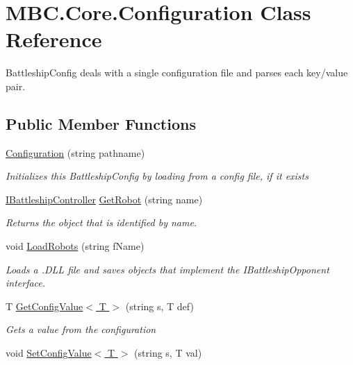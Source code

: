 \hypertarget{class_m_b_c_1_1_core_1_1_configuration}{\section{M\-B\-C.\-Core.\-Configuration Class Reference}
\label{class_m_b_c_1_1_core_1_1_configuration}
}


Battleship\-Config deals with a single configuration file and parses each key/value pair. 


\subsection*{Public Member Functions}
\begin{DoxyCompactItemize}
\item 
\hypertarget{class_m_b_c_1_1_core_1_1_configuration_aa23a1361918822852458878233671d96}{\hyperlink{class_m_b_c_1_1_core_1_1_configuration_aa23a1361918822852458878233671d96}{Configuration} (string pathname)}\label{class_m_b_c_1_1_core_1_1_configuration_aa23a1361918822852458878233671d96}

\begin{DoxyCompactList}\small\item\em Initializes this Battleship\-Config by loading from a config file, if it exists\end{DoxyCompactList}\item 
\hyperlink{interface_m_b_c_1_1_core_1_1_i_battleship_controller}{I\-Battleship\-Controller} \hyperlink{class_m_b_c_1_1_core_1_1_configuration_a82cce6b1d5e8a2d11f98ca930f6c76ad}{Get\-Robot} (string name)
\begin{DoxyCompactList}\small\item\em Returns the object that is identified by name.\end{DoxyCompactList}\item 
void \hyperlink{class_m_b_c_1_1_core_1_1_configuration_a1b9e29410c2026341fcf7157ff927781}{Load\-Robots} (string f\-Name)
\begin{DoxyCompactList}\small\item\em Loads a .D\-L\-L file and saves objects that implement the I\-Battleship\-Opponent interface.\end{DoxyCompactList}\item 
T \hyperlink{class_m_b_c_1_1_core_1_1_configuration_a1069037ddfad1eb59edbd38d10c838c4}{Get\-Config\-Value$<$ T $>$} (string s, T def)
\begin{DoxyCompactList}\small\item\em Gets a value from the configuration\end{DoxyCompactList}\item 
\hypertarget{class_m_b_c_1_1_core_1_1_configuration_a5b828ab347552eaf301846d209a10027}{void \hyperlink{class_m_b_c_1_1_core_1_1_configuration_a5b828ab347552eaf301846d209a10027}{Set\-Config\-Value$<$ T $>$} (string s, T val)}\label{class_m_b_c_1_1_core_1_1_configuration_a5b828ab347552eaf301846d209a10027}


\end{DoxyCompactItemize}
